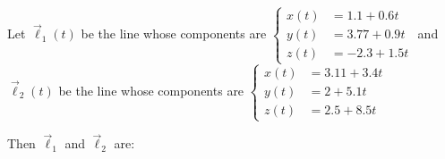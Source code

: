 \documentclass{ximera}
\author{Gregory Hartman \and Matthew Carr}
\begin{document}
\begin{exercise}




Let $\vec{\ell}_{1}(t)$ be the line whose components are $\left\{ \begin{aligned}x(t) & =1.1+0.6t\\
y(t) & =3.77+0.9t\\
z(t) & =-2.3+1.5t
\end{aligned}
\right.$  and $\vec{\ell}_{2}(t)$ be the line whose components are $\left\{ \begin{aligned}x(t) & =3.11+3.4t\\
y(t) & =2+5.1t\\
z(t) & =2.5+8.5t
\end{aligned}
\right.$

Then $\vec{\ell}_{1}$ and $\vec{\ell}_{2}$ are: 

\begin{multipleChoice}
\end{multipleChoice}


\end{exercise}
\end{document}
